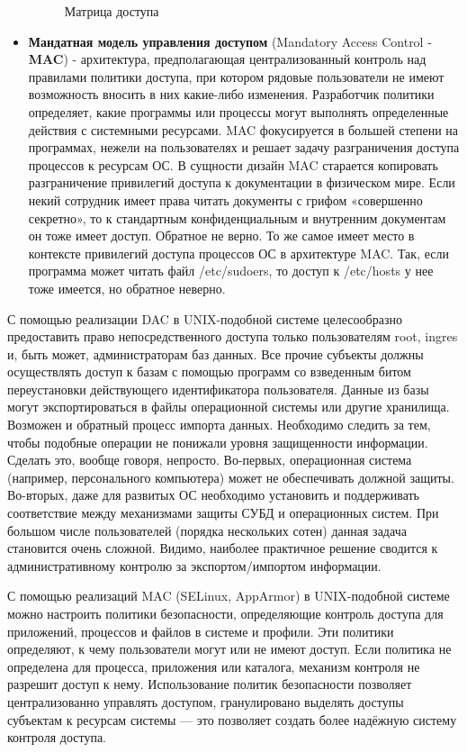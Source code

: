 \begin{itemize}
\begin{figure}[h]
                \caption{Матрица доступа}
    \label{fig:matrix-1}
\end{figure}
    \item \textbf{Мандатная модель управления доступом} (Mandatory Access Control - \textbf{MAC}) -
        архитектура, предполагающая централизованный контроль
        над правилами политики доступа, при котором рядовые пользователи не имеют возможность
        вносить в них какие-либо изменения. Разработчик политики определяет, какие программы или
        процессы могут выполнять определенные действия с системными ресурсами. MAC фокусируется в
        большей степени на программах, нежели на пользователях и решает задачу разграничения
        доступа процессов к ресурсам ОС.
        В сущности дизайн MAC старается копировать разграничение привилегий доступа к документации
        в физическом мире. Если некий сотрудник имеет права читать документы с грифом
        «совершенно секретно», то к стандартным конфиденциальным и внутренним документам
        он тоже имеет доступ. Обратное  не верно. То же самое имеет место в контексте привилегий
        доступа процессов ОС в архитектуре MAC. Так, если программа может читать файл /etc/sudoers,
        то доступ к /etc/hosts у нее тоже имеется, но обратное неверно.
\end{itemize}

С помощью реализации DAC в UNIX-подобной системе целесообразно предоставить право непосредственного доступа
только пользователям root, ingres и, быть может, администраторам баз данных. Все прочие
субъекты должны осуществлять доступ к базам с помощью программ со взведенным битом переустановки
действующего идентификатора пользователя.
Данные из базы могут экспортироваться в файлы операционной системы или другие хранилища. Возможен и
обратный процесс импорта данных. Необходимо следить за тем, чтобы подобные операции не понижали
уровня защищенности информации. Сделать это, вообще говоря, непросто. Во-первых, операционная
система (например, персонального компьютера) может не обеспечивать должной защиты. Во-вторых, даже
для развитых ОС необходимо установить и поддерживать соответствие между механизмами защиты СУБД и
операционных систем. При большом числе пользователей (порядка нескольких сотен) данная задача
становится очень сложной. Видимо, наиболее практичное решение сводится к административному контролю
за экспортом/импортом информации.

С помощью реализаций MAC (SELinux, AppArmor) в UNIX-подобной системе можно настроить политики безопасности,
определяющие контроль доступа для приложений, процессов и файлов в системе и профили. Эти политики
определяют, к чему пользователи могут или не имеют доступ. Если политика не определена для процесса,
приложения или каталога, механизм контроля не разрешит доступ к нему.
Использование политик безопасности позволяет централизованно управлять доступом, гранулировано
выделять доступы субъектам к ресурсам системы — это позволяет создать более надёжную систему
контроля доступа.

